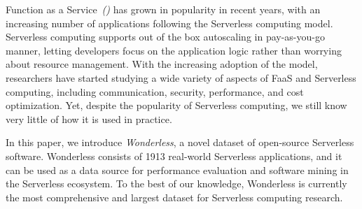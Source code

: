 
Function as a Service~\emph{(\faas)} has grown in popularity in recent years, 
with an increasing number of applications following the Serverless computing model. 
Serverless computing supports out of the box autoscaling in pay-as-you-go manner, 
letting developers focus on the application logic rather than worrying 
about resource management. 
%
With the increasing adoption of the \faas model, researchers have started 
studying a wide variety of aspects of FaaS and Serverless computing, 
including communication, security, performance, and cost optimization. 
Yet, despite the popularity of Serverless computing, we still know very little of how it 
is used in practice.

In this paper, we introduce \emph{Wonderless}, a novel dataset
of open-source Serverless software. 
Wonderless consists of 1913 real-world Serverless applications, 
and it can be used as a data source for performance evaluation and 
software mining in the Serverless ecosystem. To the best of our knowledge, 
Wonderless is currently the most comprehensive and largest dataset
for Serverless computing research.



